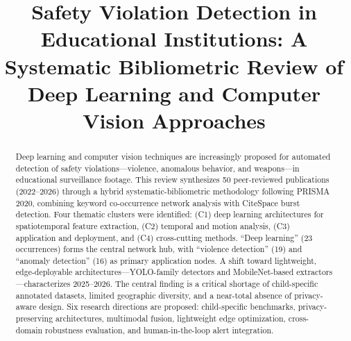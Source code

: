 \documentclass[conference]{IEEEtran}
\begin{document}
\title{Safety Violation Detection in Educational Institutions: A Systematic Bibliometric Review of Deep Learning and Computer Vision Approaches}

\author{
\and
{}
\and
{}
}

\maketitle

\begin{abstract}
Deep learning and computer vision techniques are increasingly proposed for automated detection of safety violations---violence, anomalous behavior, and weapons---in educational surveillance footage. This review synthesizes 50 peer-reviewed publications (2022--2026) through a hybrid systematic-bibliometric methodology following PRISMA 2020, combining keyword co-occurrence network analysis with CiteSpace burst detection. Four thematic clusters were identified: (C1) deep learning architectures for spatiotemporal feature extraction, (C2) temporal and motion analysis, (C3) application and deployment, and (C4) cross-cutting methods. ``Deep learning'' (23 occurrences) forms the central network hub, with ``violence detection'' (19) and ``anomaly detection'' (16) as primary application nodes. A shift toward lightweight, edge-deployable architectures---YOLO-family detectors and MobileNet-based extractors---characterizes 2025--2026. The central finding is a critical shortage of child-specific annotated datasets, limited geographic diversity, and a near-total absence of privacy-aware design. Six research directions are proposed: child-specific benchmarks, privacy-preserving architectures, multimodal fusion, lightweight edge optimization, cross-domain robustness evaluation, and human-in-the-loop alert integration.
\end{abstract}
\end{document}
